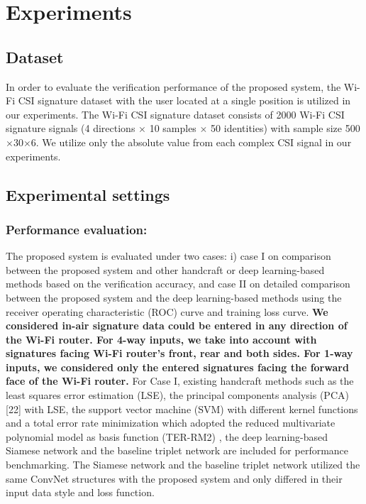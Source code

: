 \documentclass[sigconf]{acmart}
\begin{document}
\section{Experiments}

\subsection{Dataset}
 In order to evaluate the verification performance of the proposed system, the Wi-Fi CSI signature dataset \cite{moon2017air} with the user located at a single position is utilized in our experiments. The Wi-Fi CSI signature dataset consists of 2000 Wi-Fi CSI signature signals (4 directions $\times$ 10 samples $\times$ 50 identities) with sample size 500$\times$30$\times$6. We utilize only the absolute value from each complex CSI signal in our experiments.

\subsection{Experimental settings}

\subsubsection{Performance evaluation:}
The proposed system is evaluated under two cases: i) case I on comparison between the proposed system and other handcraft or deep learning-based methods based on the verification accuracy, and case II on detailed comparison between the proposed system and the deep learning-based methods using the receiver operating characteristic (ROC) curve and training loss curve. \textbf{We considered in-air signature data could be entered in any direction of the Wi-Fi router. For 4-way inputs, we take into account with signatures facing Wi-Fi router's front, rear and both sides. For 1-way inputs, we considered only the entered signatures facing the forward face of the Wi-Fi router.} For Case I, existing handcraft methods such as the least squares error estimation (LSE), the principal components analysis (PCA) [22] with LSE, the support vector machine (SVM) with different kernel functions and a total error rate minimization which adopted the reduced multivariate polynomial model as basis function (TER-RM2) \cite{toh2003fingerprint,toh2008between}, the deep learning-based Siamese network \cite{koch2015siamese} and the baseline triplet network \cite{hoffer2015deep} are included for performance benchmarking. The Siamese network and the baseline triplet network utilized the same ConvNet structures with the proposed system and only differed in their input data style and loss function.
\end{document}
